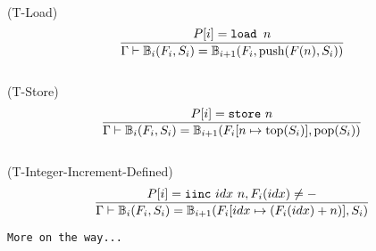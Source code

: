 \documentclass{amsart}
\newcommand{\bB}[1]{\mathbb{B}_{#1}}
\numberwithin{equation}{section}
\theoremstyle{plain} %
\theoremstyle{definition}
\theoremstyle{remark}
\begin{document}
\\
(T-Load)
\begin{equation*}
\frac{P[i] = \text{\texttt{load }} n}
{\Gamma \vdash \bB{i}(F_i, S_i) = \bB{i+1}(F_i, \text{push}(F(n), S_i))}
\end{equation*}
\\
(T-Store)
\begin{equation*}
\frac{P[i] = \text{\texttt{store} } n}
{\Gamma \vdash \bB{i}(F_i, S_i) = \bB{i+1}(F_i[n \mapsto \text{top}(S_i)], \text{pop}(S_i))}
\end{equation*}
\\
(T-Integer-Increment-Defined)
\begin{equation*}
\frac{P[i] = \text{\texttt{iinc} } idx~n, F_i(idx) \neq -}
{\Gamma \vdash \bB{i}(F_i, S_i) = \bB{i+1}(F_i[idx \mapsto (F_i(idx) + n)],S_i)}
\end{equation*}

\texttt{More on the way...}
\end{document}
